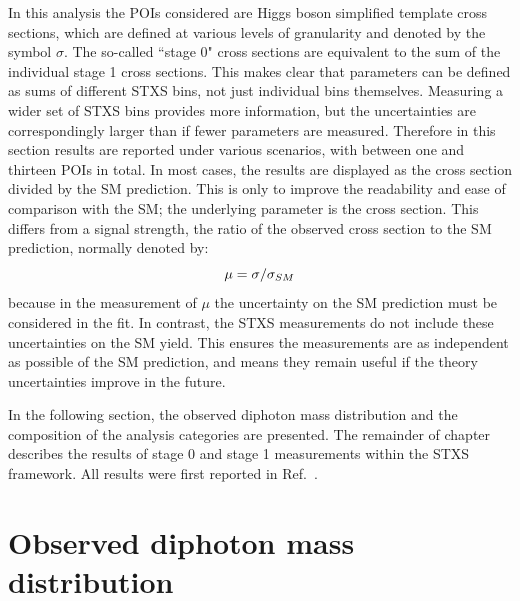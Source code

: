 In this analysis the POIs considered are Higgs boson simplified template cross sections, 
which are defined at various levels of granularity and denoted by the symbol $\sigma$.
The so-called ``stage 0" cross sections are equivalent 
to the sum of the individual stage 1 cross sections.
This makes clear that parameters can be defined as sums of different STXS bins, 
not just individual bins themselves.
Measuring a wider set of STXS bins provides more information, 
but the uncertainties are correspondingly larger than if fewer parameters are measured.
Therefore in this section results are reported under various scenarios, 
with between one and thirteen POIs in total.
In most cases, the results are displayed as the cross section divided by the SM prediction. 
This is only to improve the readability and ease of comparison with the SM;
the underlying parameter is the cross section.
This differs from a signal strength, the ratio of the observed cross section 
to the SM prediction, normally denoted by:
\begin{equation}
\mu = \sigma / \sigma_{SM}
\end{equation}
because in the measurement of $\mu$ 
the uncertainty on the SM prediction must be considered in the fit. 
In contrast, the STXS measurements do not include these uncertainties on the SM yield.
This ensures the measurements are as independent as possible of the SM prediction, 
and means they remain useful if the theory uncertainties improve in the future.

In the following section, the observed diphoton mass distribution
and the composition of the analysis categories are presented.
The remainder of chapter describes the results of stage 0 and stage 1 measurements 
within the STXS framework.
All results were first reported in Ref.~\cite{HIG-18-029}.

\section{Observed diphoton mass distribution}

